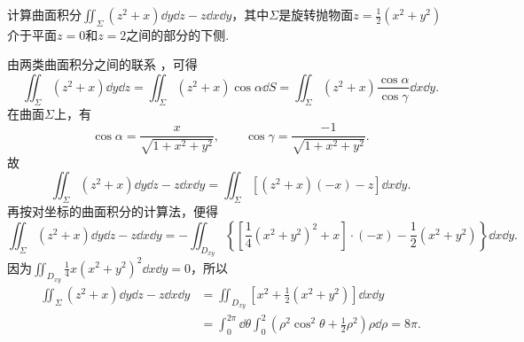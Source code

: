 \begin{example}
\def\ys{\iint_\Sigma (z^2+x) \dd{y}\dd{z} - z \dd{x}\dd{y}}%
计算曲面积分\(\ys\)，其中\(\Sigma\)是旋转抛物面\(z = \frac{1}{2}(x^2+y^2)\)介于平面\(z=0\)和\(z=2\)之间的部分的下侧.
\begin{solution}
由两类曲面积分之间的联系 ，可得\[
\iint_\Sigma (z^2+x) \dd{y}\dd{z}
= \iint_\Sigma (z^2+x) \cos\alpha \dd{S}
= \iint_\Sigma (z^2+x) \frac{\cos\alpha}{\cos\gamma} \dd{x}\dd{y}.
\]在曲面\(\Sigma\)上，有\[
\cos\alpha
= \frac{x}{\sqrt{1+x^2+y^2}},
\qquad
\cos\gamma
= \frac{-1}{\sqrt{1+x^2+y^2}}.
\]故\[
\ys
= \iint_\Sigma [(z^2+x)(-x) - z] \dd{x}\dd{y}.
\]
再按对坐标的曲面积分的计算法，便得\[
\ys
= - \iint_{D_{xy}} \left\{
	\left[
		\frac{1}{4} (x^2+y^2)^2
		+ x
	\right] \cdot (-x)
	- \frac{1}{2} (x^2+y^2)
\right\} \dd{x}\dd{y}.
\]因为\(\iint_{D_{xy}} \frac{1}{4} x(x^2+y^2)^2 \dd{x}\dd{y} = 0\)，所以\begin{align*}
\ys
&= \iint_{D_{xy}} \left[x^2+\frac{1}{2}(x^2+y^2)\right] \dd{x}\dd{y} \\
&= \int_0^{2\pi} \dd{\theta} \int_0^2 \left(\rho^2 \cos^2\theta + \frac{1}{2} \rho^2\right) \rho \dd{\rho}
= 8\pi.
\end{align*}
\end{solution}
\end{example}
